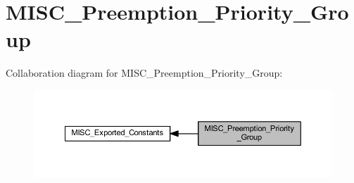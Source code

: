\hypertarget{group___m_i_s_c___preemption___priority___group}{}\section{M\+I\+S\+C\+\_\+\+Preemption\+\_\+\+Priority\+\_\+\+Group}
\label{group___m_i_s_c___preemption___priority___group}
Collaboration diagram for M\+I\+S\+C\+\_\+\+Preemption\+\_\+\+Priority\+\_\+\+Group\+:\nopagebreak
\begin{figure}[H]
\begin{center}
\leavevmode
\includegraphics[width=350pt]{group___m_i_s_c___preemption___priority___group}
\end{center}
\end{figure}
